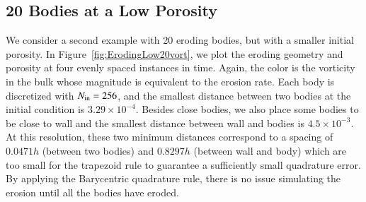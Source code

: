 \documentclass[preprint, 10pt]{elsarticle}
\begin{document}
\subsection{20 Bodies at a Low Porosity}
We consider a second example with 20 eroding bodies, but with a smaller
initial porosity.  In Figure~\ref{fig:ErodingLow20vort}, we plot the
eroding geometry and porosity at four evenly spaced instances in time.
Again, the color is the vorticity in the bulk whose magnitude is
equivalent to the erosion rate.  Each body is discretized with $N_{\mathrm{in}} =
256$, and the smallest distance between two bodies at the initial
condition is $3.29 \times 10^{-4}$. 
{\color{red} Besides close bodies, we also place some bodies to be close to wall 
and the smallest distance between wall and bodies is $4.5 \times 10^{-3}$.} 
At this resolution, {\color{red} these two minimum distances correspond to a spacing of $0.0471h$ 
(between two bodies) and $0.8297h$ (between wall and body)
} which are too small for the
trapezoid rule to guarantee a sufficiently small quadrature error.  By
applying the Barycentric quadrature rule, there is no issue simulating
the erosion until all the bodies have eroded.
\end{document}
